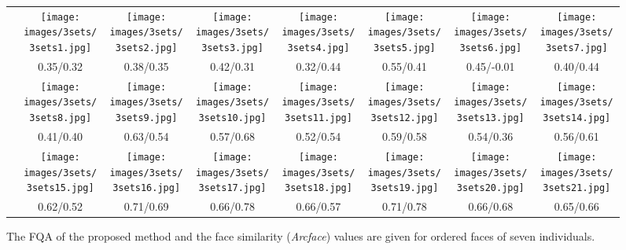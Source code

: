 \documentclass[runningheads]{llncs}
\begin{document}
\begin{figure*}[t]
\setlength\tabcolsep{2pt}\begin{tabularx}{\textwidth}{@{}c*{7}{C}@{}}
 &
   \texttt{[image: images/3sets/3sets1.jpg]} &
   \texttt{[image: images/3sets/3sets2.jpg]}
   &
    \texttt{[image: images/3sets/3sets3.jpg]}
   &
   \texttt{[image: images/3sets/3sets4.jpg]}
   &
   \texttt{[image: images/3sets/3sets5.jpg]}
   &
   \texttt{[image: images/3sets/3sets6.jpg]}
   &
   \texttt{[image: images/3sets/3sets7.jpg]} \\
   
   & 0.35/0.32 & 0.38/0.35 & 0.42/0.31 & 0.32/0.44 & 0.55/0.41 & 0.45/-0.01 & 0.40/0.44 \\
   &
   \texttt{[image: images/3sets/3sets8.jpg]} &
   \texttt{[image: images/3sets/3sets9.jpg]}
   &
    \texttt{[image: images/3sets/3sets10.jpg]}
   &
   \texttt{[image: images/3sets/3sets11.jpg]}
   &
   \texttt{[image: images/3sets/3sets12.jpg]}
   &
   \texttt{[image: images/3sets/3sets13.jpg]}
   &
   \texttt{[image: images/3sets/3sets14.jpg]} \\
   &
   0.41/0.40 & 0.63/0.54 & 0.57/0.68 & 0.52/0.54 & 0.59/0.58 & 0.54/0.36 & 0.56/0.61 \\
   &
   \texttt{[image: images/3sets/3sets15.jpg]} &
   \texttt{[image: images/3sets/3sets16.jpg]}
   &
    \texttt{[image: images/3sets/3sets17.jpg]}
   &
   \texttt{[image: images/3sets/3sets18.jpg]}
   &
   \texttt{[image: images/3sets/3sets19.jpg]}
   &
   \texttt{[image: images/3sets/3sets20.jpg]}
   &
   \texttt{[image: images/3sets/3sets21.jpg]}
   \\
   & 0.62/0.52 & 0.71/0.69 & 0.66/0.78 & 0.66/0.57 & 0.71/0.78 & 0.66/0.68 & 0.65/0.66 \\
\end{tabularx}
\caption{The FQA of the proposed method and the face similarity (\textit{Arcface}) values are given for ordered faces of seven individuals.} \label{fig:3sets}
\end{figure*}
\end{document}
